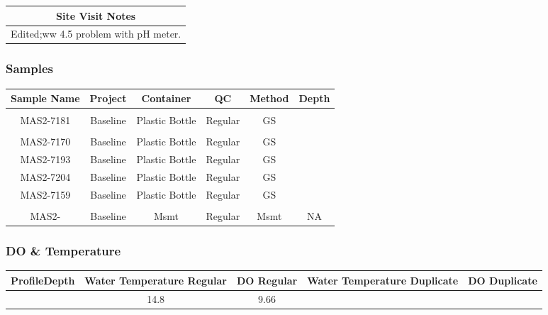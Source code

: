 \documentclass[
  letterpaper,
  DIV=11,
  numbers=noendperiod]{scrartcl}
\begin{document}
\begin{longtable*}{c}
\toprule
Site Visit Notes \\ 
\midrule\addlinespace[2.5pt]
Edited;ww 4.5
problem with pH meter. \\ 
\bottomrule
\end{longtable*}

\subsubsection{Samples}

\begin{longtable*}{cccccc}
\toprule
Sample Name & Project & Container & QC & Method & Depth \\ 
\midrule\addlinespace[2.5pt]
 \\ 
\midrule\addlinespace[2.5pt]
MAS2-7181 & Baseline & Plastic Bottle & Regular & GS &  \\ 
\midrule\addlinespace[2.5pt]
 \\ 
\midrule\addlinespace[2.5pt]
MAS2-7170 & Baseline & Plastic Bottle & Regular & GS &  \\ 
MAS2-7193 & Baseline & Plastic Bottle & Regular & GS &  \\ 
MAS2-7204 & Baseline & Plastic Bottle & Regular & GS &  \\ 
MAS2-7159 & Baseline & Plastic Bottle & Regular & GS &  \\ 
\midrule\addlinespace[2.5pt]
 \\ 
\midrule\addlinespace[2.5pt]
MAS2- & Baseline & Msmt & Regular & Msmt & NA \\ 
\bottomrule
\end{longtable*}

\subsubsection{DO \& Temperature}

\begin{longtable*}{rcccc}
\toprule
ProfileDepth & Water Temperature Regular & DO Regular & Water Temperature Duplicate & DO Duplicate \\ 
\midrule{} & 14.8 & 9.66 &  &  \\ 
\bottomrule
\end{longtable*}
\end{document}

